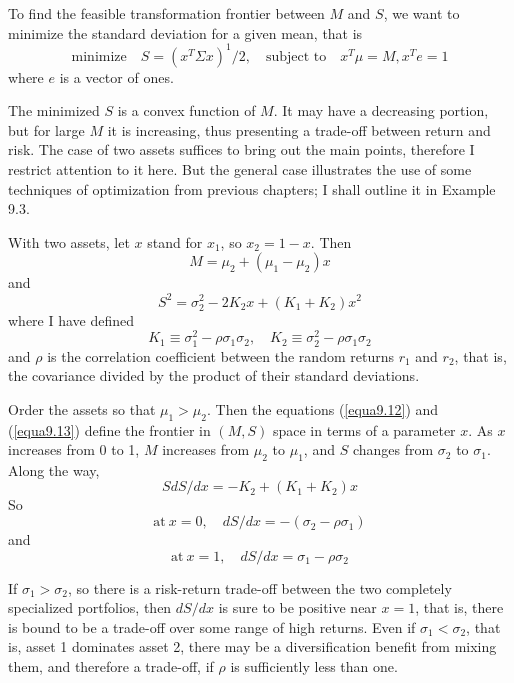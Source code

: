 To find the feasible transformation frontier between $M$ and $S$, we want to minimize the standard deviation for a given mean, that is 
\begin{equation*}
\mbox{minimize} \quad S = ( x^T \Sigma x)^1/2, \quad \mbox{subject to} \quad x^T \mu =M, x^T e =1 
\end{equation*}
where $e$ is a vector of ones.

The minimized $S$ is a convex function of $M$. It may have a decreasing portion, but for large $M$ it is increasing, thus presenting a trade-off between return and risk. The case of two assets suffices to bring out the main points, therefore I restrict attention to it here. But the general case illustrates the use of some techniques of optimization from previous chapters; I shall outline it in Example 9.3.

With two assets, let $x$ stand for $x_1$, so $x_2=1-x$. Then
\begin{equation} \label{equa9.12}
M = \mu_2 + (\mu_1 - \mu_2)x
\end{equation}
and 
\begin{equation} \label{equa9.13}
S^2 = \sigma_2^2 -2 K_2 x + (K_1 + K_2) x^2
\end{equation}
where I have defined
\begin{equation*}  
K_1 \equiv \sigma_1^2 - \rho \sigma_1 \sigma_2, \quad K_2 \equiv \sigma_2^2 - \rho \sigma_1 \sigma_2
\end{equation*}
and $\rho$ is the correlation coefficient between the random returns $r_1$ and $r_2$, that is, the covariance divided by the product of their standard deviations.

Order the assets so that $\mu_1 > \mu_2$. Then the equations (\ref{equa9.12}) and (\ref{equa9.13}) define the frontier in $(M,S)$ space in terms of a parameter $x$. As $x$ increases from 0 to 1, $M$ increases from $\mu_2$ to $\mu_1$, and $S$ changes from $\sigma_2$ to $\sigma_1$. Along the way,
\begin{equation} \label{equa9.14}
 S dS /dx = -K_2 + (K_1 + K_2) x
\end{equation}
So
\begin{equation*} 
\mbox{at} \ x=0,  \quad  dS / dx = - (\sigma_2 - \rho \sigma_1)
\end{equation*}
and 
\begin{equation*} 
\mbox{at} \ x=1,  \quad  dS / dx = \sigma_1 - \rho \sigma_2
\end{equation*}

If $\sigma_1 > \sigma_2$, so there is a risk-return trade-off between the two completely specialized portfolios, then $dS/dx$ is sure to be positive near $x=1$, that is, there is bound to be a trade-off over some range of high returns. Even if $\sigma_1 < \sigma_2$, that is, asset 1 dominates asset 2, there may be a diversification benefit from mixing them, and therefore a trade-off, if $\rho$ is sufficiently less than one.

